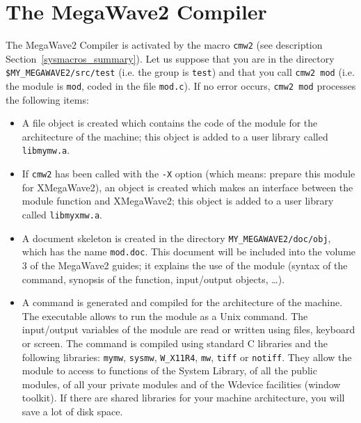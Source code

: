 \section{The MegaWave2 Compiler}
\label{intro_compiler}

The MegaWave2 Compiler is activated by the macro \verb+cmw2+ 
(see description Section~\ref{sysmacros_summary}). 
Let us suppose that you are in the directory \verb+$MY_MEGAWAVE2/src/test+ (i.e. the group is \verb+test+) and that you call \verb+cmw2 mod+ (i.e. the module is \verb+mod+, coded in the file \verb+mod.c+).
If no error occurs, \verb+cmw2 mod+ processes the following items:
\begin{itemize}
\item A file object is created which contains the code of the module for the architecture of the machine; this object is added to a user library called \verb+libmymw.a+.
\item If \verb+cmw2+ has been called with the \verb+-X+ option (which means: prepare this module for XMegaWave2), an object is created which makes an interface between the module function and XMegaWave2; this object is added to a user library called \verb+libmyxmw.a+.
\item A document skeleton is created in the directory \verb+MY_MEGAWAVE2/doc/obj+, which has the name \verb+mod.doc+. 
This document will be included into the volume 3 of the MegaWave2 guides; it explains the use of the module (syntax of the command, synopsis of the function, input/output objects, \ldots).
\item A command is generated and compiled for the architecture of the machine.
The executable allows to run the module as a Unix command. 
The input/output variables of the module are read or written using files, keyboard or screen.
The command is compiled using standard C libraries and the following libraries:
\verb+mymw+, \verb+sysmw+, \verb+W_X11R4+, \verb+mw+, \verb+tiff+ or \verb+notiff+. 
They allow the module to access to functions of the System Library, of all the public modules, 
of all your private modules and of the Wdevice facilities (window toolkit). 
If there are shared libraries for your machine architecture, you will save a lot of disk space.
\end{itemize}
